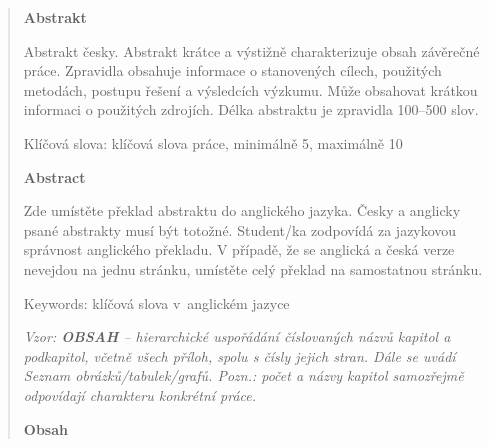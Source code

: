 \documentclass[
]{article}
\begin{document}
    \begin{quote}
        \textbf{Abstrakt}

        Abstrakt česky. Abstrakt krátce a výstižně charakterizuje obsah
        závěrečné práce. Zpravidla obsahuje informace o stanovených cílech,
        použitých metodách, postupu řešení a výsledcích výzkumu. Může obsahovat
        krátkou informaci o použitých zdrojích. Délka abstraktu je zpravidla
        100--500 slov.

        Klíčová slova: klíčová slova práce, minimálně 5, maximálně 10

        \textbf{Abstract}

        Zde umístěte překlad abstraktu do anglického jazyka. Česky a anglicky
        psané abstrakty musí být totožné. Student/ka zodpovídá za jazykovou
        správnost anglického překladu. V případě, že se anglická a česká verze
        nevejdou na jednu stránku, umístěte celý překlad na samostatnou stránku.

        Keywords: klíčová slova v~anglickém jazyce

        \newpage
        \emph{Vzor: \textbf{OBSAH} -- hierarchické uspořádání číslovaných názvů
        kapitol a podkapitol, včetně všech příloh, spolu s čísly jejich stran.
        Dále se uvádí Seznam obrázků/tabulek/grafů. Pozn.: počet a názvy kapitol
        samozřejmě odpovídají charakteru konkrétní práce.}

        \textbf{Obsah}
    \end{quote}
%
%
%
%
%
%
%
%
%
%
\end{document}

